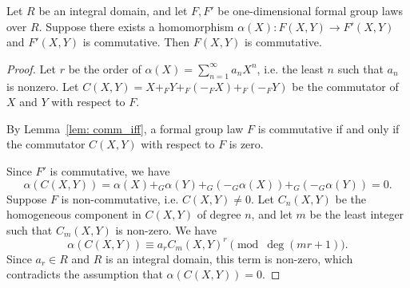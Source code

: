 \begin{lemma}
    Let $R$ be an integral domain, and let $F, F'$ be one-dimensional formal group laws
    over $R$. Suppose there exists a homomorphism
    $\alpha(X): F(X,Y) \to F'(X,Y)$ and $F'(X,Y)$ is commutative. Then $F(X,Y)$ is
    commutative.
    \label{lem: target_com}
\end{lemma}

\begin{proof}
    Let $r$ be the order of $\alpha (X) = \sum_{n=1} ^ \infty a_n X^n$, i.e. the least $n$ such
    that $a_n$ is nonzero. Let $C(X,Y) = X +_F Y +_F (-_F X) +_F (-_F Y) $ be the
    commutator of $X$ and $Y$ with respect to $F$. \par
    By Lemma~\ref{lem: comm_iff}, a formal group law $F$ is commutative if and only if the commutator
    $C(X,Y)$ with respect to $F$ is zero.

    Since $F'$ is commutative, we have
    \[ \alpha (C(X,Y)) = \alpha(X)+_G \alpha(Y)+_G(-_G \alpha(X))+_G(-_G\alpha(Y)) = 0.\]
    Suppose $F$ is non-commutative, i.e. $C(X,Y) \neq 0$. Let $C_n(X,Y)$ be the homogeneous
    component in $C(X,Y)$ of degree $n$, and let $m$ be the least integer such that
    $C_m(X,Y)$ is non-zero. We have
    \[ \alpha (C(X,Y)) \equiv a_r C_m(X,Y) ^ r \pmod{\deg (mr + 1)}. \]
    Since $a_r \in R$ and $R$ is an integral domain, this term is non-zero, which contradicts
    the assumption that $\alpha (C(X,Y))= 0$.
\end{proof}




